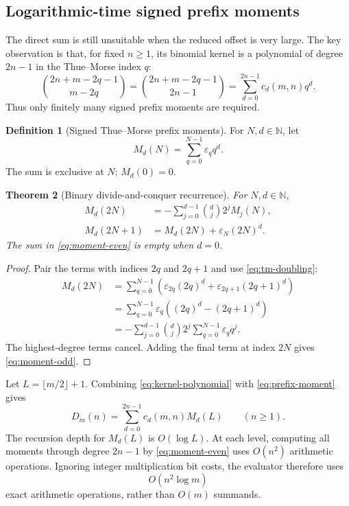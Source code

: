 \documentclass[11pt,oneside]{article}
\newtheorem{theorem}{Theorem}[section]
\theoremstyle{definition}
\newtheorem{definition}[theorem]{Definition}
\theoremstyle{remark}
\newcommand{\N}{\mathbb N}
\newcommand{\eps}{\varepsilon}
\newcommand{\Diag}{D}
\begin{document}
\subsection{Logarithmic-time signed prefix moments}

The direct sum is still unsuitable when the reduced offset is very large.
The key observation is that, for fixed $n\ge1$, its binomial kernel is a
polynomial of degree $2n-1$ in the Thue--Morse index $q$:
\begin{equation}
 \binom{2n+m-2q-1}{m-2q}
 =\binom{2n+m-2q-1}{2n-1}
 =\sum_{d=0}^{2n-1}c_d(m,n)q^d.
 \label{eq:kernel-polynomial}
\end{equation}
Thus only finitely many signed prefix moments are required.

\begin{definition}[Signed Thue--Morse prefix moments]
For $N,d\in\N$, let
\begin{equation}
 M_d(N)=\sum_{q=0}^{N-1}\eps_qq^d.
 \label{eq:prefix-moment}
\end{equation}
The sum is exclusive at $N$; $M_d(0)=0$.
\end{definition}

\begin{theorem}[Binary divide-and-conquer recurrence]
\label{thm:moment-recurrence}
For $N,d\in\N$,
\begin{align}
 M_d(2N)
 &=-\sum_{j=0}^{d-1}\binom dj2^jM_j(N),
 \label{eq:moment-even}\\
 M_d(2N+1)
 &=M_d(2N)+\eps_N(2N)^d.
 \label{eq:moment-odd}
\end{align}
The sum in \eqref{eq:moment-even} is empty when $d=0$.
\end{theorem}

\begin{proof}
Pair the terms with indices $2q$ and $2q+1$ and use
\eqref{eq:tm-doubling}:
\begin{align*}
 M_d(2N)
 &=\sum_{q=0}^{N-1}
   \left(\eps_{2q}(2q)^d+\eps_{2q+1}(2q+1)^d\right)\\
 &=\sum_{q=0}^{N-1}\eps_q\left((2q)^d-(2q+1)^d\right)\\
 &=-\sum_{j=0}^{d-1}\binom dj2^j
     \sum_{q=0}^{N-1}\eps_qq^j.
\end{align*}
The highest-degree terms cancel.  Adding the final term at index $2N$ gives
\eqref{eq:moment-odd}.
\end{proof}

Let $L=\lfloor m/2\rfloor+1$.  Combining
\eqref{eq:kernel-polynomial} with \eqref{eq:prefix-moment} gives
\begin{equation}
 \boxed{\quad
 \Diag_m(n)=\sum_{d=0}^{2n-1}c_d(m,n)M_d(L)
 \qquad(n\ge1).
 \quad}
 \label{eq:moment-evaluator}
\end{equation}
The recursion depth for $M_d(L)$ is $O(\log L)$.  At each level, computing
all moments through degree $2n-1$ by \eqref{eq:moment-even} uses
$O(n^2)$ arithmetic operations.  Ignoring integer multiplication bit costs,
the evaluator therefore uses
\begin{equation}
 O(n^2\log m)
 \label{eq:moment-complexity}
\end{equation}
exact arithmetic operations, rather than $O(m)$ summands.
\end{document}
